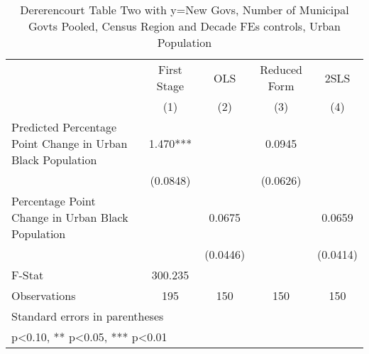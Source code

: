 \begin{table}[htbp]\centering
\def\sym#1{\ifmmode^{#1}\else\(^{#1}\)\fi}
\caption{Dererencourt Table Two with y=New Govs, Number of Municipal Govts  Pooled, Census Region and Decade FEs controls, Urban Population}
\begin{tabular}{l*{4}{c}}
\toprule
                    & First Stage   &         OLS   &Reduced Form   &        2SLS   \\
                    &\multicolumn{1}{c}{(1)}   &\multicolumn{1}{c}{(2)}   &\multicolumn{1}{c}{(3)}   &\multicolumn{1}{c}{(4)}   \\
\midrule
Predicted Percentage Point Change in Urban Black Population&       1.470***&               &      0.0945   &               \\
                    &    (0.0848)   &               &    (0.0626)   &               \\
\addlinespace
Percentage Point Change in Urban Black Population&               &      0.0675   &               &      0.0659   \\
                    &               &    (0.0446)   &               &    (0.0414)   \\
\midrule
F-Stat              &     300.235   &               &               &               \\
Observations        &         195   &         150   &         150   &         150   \\
\bottomrule
\multicolumn{5}{l}{\footnotesize Standard errors in parentheses}\\
\multicolumn{5}{l}{\footnotesize * p<0.10, ** p<0.05, *** p<0.01}\\
\end{tabular}
\end{table}
